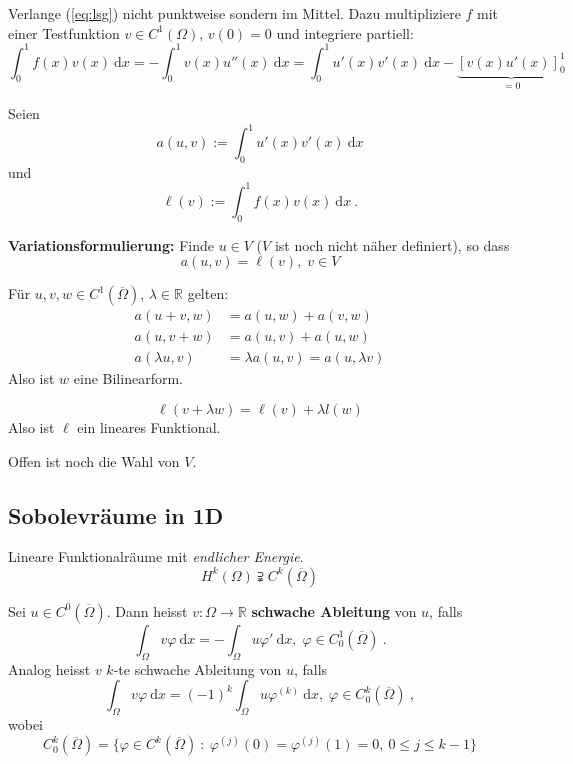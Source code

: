 \begin{idee}
Verlange (\ref{eq:lsg}) nicht punktweise sondern im Mittel. Dazu multipliziere 
$f$ mit einer Testfunktion $v \in C^1(\Omega)$, $v(0) = 0$ und integriere
partiell:
\[
\int_0^1 f(x) v(x) \ \mathrm dx = - \int_0^1 v(x) u''(x) \ \mathrm dx
    = \int_0^1 u'(x) v'(x) \ \mathrm dx - \underbrace{ \left[v(x) u'(x) \right]_0^1}_{=0}
\]
\end{idee}

Seien
\[
a(u,v) := \int_0^1 u'(x) v'(x) \ \mathrm dx
\]
und
\[
\ell(v) := \int_0^1 f(x) v(x) \ \mathrm dx \ .
\]

\textbf{Variationsformulierung:} Finde $u \in V$ ($V$ ist noch nicht näher definiert), so dass
\[
    a(u,v) = \ell(v), \; v \in V \label{eq:var} \tag{V}
\]

Für $u, v, w \in C^1(\overline \Omega)$, $\lambda \in \mathbb R$ gelten:
\begin{align*}
a(u+v, w) &= a(u,w) + a(v,w) \\
a(u, v+w) &= a(u,v) + a(u,w) \\
a(\lambda u, v) &= \lambda a(u,v) = a(u, \lambda v)
\end{align*}
Also ist $w$ eine Bilinearform.

\[
\ell(v + \lambda w) = \ell(v) + \lambda l(w)
\]
Also ist $\ell$ ein lineares Funktional.

Offen ist noch die Wahl von $V$.

\subsection{Sobolevräume in 1D}
\begin{idee}
Lineare Funktionalräume mit \textit{endlicher Energie}.
\[
H^k(\Omega) \supsetneqq C^k(\overline \Omega)
\]
\end{idee}

\begin{defi}
Sei $u \in C^0(\overline \Omega)$. Dann heisst $v: \Omega \to \mathbb R$ \textbf{schwache Ableitung} 
von $u$, falls
\[
\int_\Omega v \varphi \ \mathrm dx = - \int_\Omega u \varphi' \ \mathrm dx, \; \varphi \in C_0^1(\overline \Omega) \ .
\]
Analog heisst $v$ $k$-te schwache Ableitung von $u$, falls
\[
\int_\Omega v \varphi \ \mathrm dx = (-1)^k \int_\Omega u \varphi^{(k)} \ \mathrm dx, 
    \; \varphi \in C_0^k(\overline \Omega) \ ,
\]
wobei
\[
C_0^k(\overline \Omega) = \{ \varphi \in C^k(\overline \Omega) \ : \ 
    \varphi^{(j)}(0) = \varphi^{(j)}(1) = 0, \ 0 \leq j \leq k-1 \}
\]
\end{defi}

